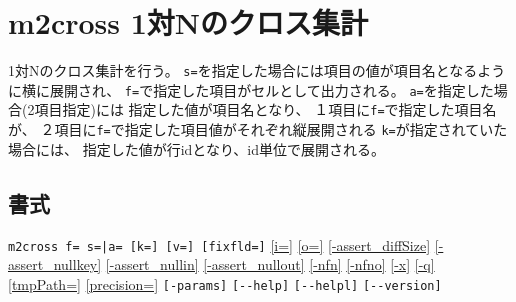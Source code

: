 %

\section{m2cross 1対Nのクロス集計\label{sect:mcross}}
1対Nのクロス集計を行う。
\verb|s=|を指定した場合には項目の値が項目名となるように横に展開され、
\verb|f=|で指定した項目がセルとして出力される。
\verb|a=|を指定した場合(2項目指定)には
指定した値が項目名となり、
１項目に\verb|f=|で指定した項目名が、
２項目に\verb|f=|で指定した項目値がそれぞれ縦展開される
\verb|k=|が指定されていた場合には、
指定した値が行idとなり、id単位で展開される。

\subsection*{書式}
\verb/m2cross f= s=|a= [k=] [v=] [fixfld=]/
\hyperref[sect:option_i]{[i=]}
\hyperref[sect:option_o]{[o=]}
\hyperref[sect:option_assert_diffSize]{[-assert\_diffSize]}
\hyperref[sect:option_assert_nullkey]{[-assert\_nullkey]}
\hyperref[sect:option_assert_nullin]{[-assert\_nullin]}
\hyperref[sect:option_assert_nullout]{[-assert\_nullout]}
\hyperref[sect:option_nfn]{[-nfn]} 
\hyperref[sect:option_nfno]{[-nfno]}  
\hyperref[sect:option_x]{[-x]}
\hyperref[sect:option_q]{[-q]}
\hyperref[sect:option_option_tmppath]{[tmpPath=]}
\hyperref[sect:option_precision]{[precision=]}
\verb|[-params]|
\verb|[--help]|
\verb|[--helpl]|
\verb|[--version]|\\

